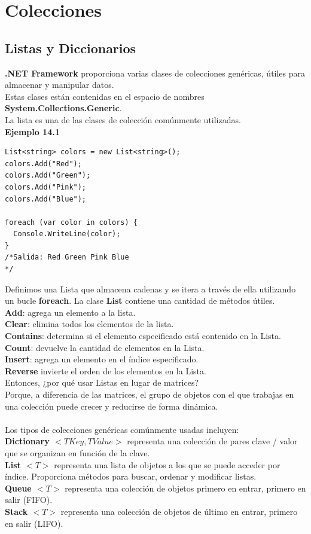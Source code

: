 \documentclass[12pt,a4paper]{report}
\begin{document}
\chapter{Colecciones}
\section{Listas y Diccionarios}
\textbf{.NET Framework} proporciona varias clases de colecciones genéricas, útiles para almacenar y manipular datos.\\Estas clases están contenidas en el espacio de nombres\textbf{ System.Collections.Generic}.\\La lista es una de las clases de colección comúnmente utilizadas.\\\textbf{Ejemplo 14.1}
\begin{lstlisting}
List<string> colors = new List<string>();
colors.Add("Red");
colors.Add("Green");
colors.Add("Pink");
colors.Add("Blue");

foreach (var color in colors) {
  Console.WriteLine(color);
}
/*Salida: Red Green Pink Blue
*/
\end{lstlisting}Definimos una Lista que almacena cadenas y se itera a través de ella utilizando un bucle\textbf{ foreach}. La clase\textbf{ List} contiene una cantidad de métodos útiles.\\\textbf{Add}: agrega un elemento a la lista.\\\textbf{Clear}: elimina todos los elementos de la lista.\\\textbf{Contains}: determina si el elemento especificado está contenido en la Lista.\\\textbf{Count}: devuelve la cantidad de elementos en la Lista.\\\textbf{Insert}: agrega un elemento en el índice especificado.\\\textbf{Reverse} invierte el orden de los elementos en la Lista.\\Entonces, ¿por qué usar Listas en lugar de matrices?\\Porque, a diferencia de las matrices, el grupo de objetos con el que trabajas en una colección puede crecer y reducirse de forma dinámica.\\\\Los tipos de colecciones genéricas comúnmente usadas incluyen:\\\textbf{ Dictionary $<TKey, TValue>$} representa una colección de pares clave / valor que se organizan en función de la clave.\\\textbf{List $<T>$} representa una lista de objetos a los que se puede acceder por índice. Proporciona métodos para buscar, ordenar y modificar listas.\\\textbf{Queue $<T>$} representa una colección de objetos primero en entrar, primero en salir (FIFO).\\\textbf{Stack $<T>$} representa una colección de objetos de último en entrar, primero en salir (LIFO).
\end{document}

